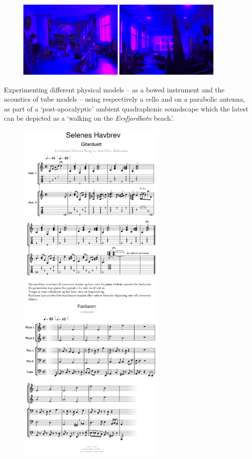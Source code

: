 \begin{enumerate}
\begin{figure}[H]
\hfill \includegraphics[width=0.92\textwidth]{mp/img/img5}
\end{figure}
Experimenting different physical models -- as a bowed instrument and the acoustics of tube models -- using respectively a cello and on a parabolic antenna, as part of a `post-apocalyptic' ambient quadraphonic soundscape which the latest can be depicted as a  `walking on the \textit{Ersfjordbotn} beach'.
\end{enumerate}

\begin{figure}[htp]
	\begin{center}
		\includegraphics[width=0.65\textwidth]{mp/img/img6}
		\label{sh}
	\end{center}
\end{figure}

